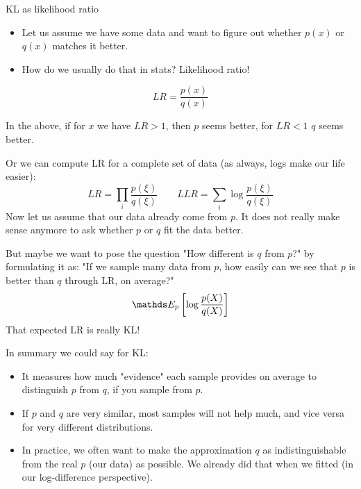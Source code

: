 \documentclass[11pt,compress,t,notes=noshow, xcolor=table]{beamer}
\begin{document}
\begin{vbframe}{KL as likelihood ratio}

\begin{itemize}
\item Let us assume we have some data and want to figure out whether $p(x)$ or $q(x)$ matches it better.
\item How do we usually do that in stats? Likelihood ratio! 
\end{itemize}

$$ LR = \frac{p(x)}{q(x)} $$
  
In the above, if for $x$ we have $LR>1$, then $p$ seems better, for $LR < 1$ $q$ seems better.

\framebreak

Or we can compute LR for a complete set of data (as always, logs make our life easier):
$$ LR = \prod_i \frac{p(\xi)}{q(\xi)} \qquad LLR = \sum_i \log \frac{p(\xi)}{q(\xi)} $$
Now let us assume that our data already come from $p$. It does not really make sense anymore to ask 
whether $p$ or $q$ fit the data better.

But maybe we want to pose the question "How different is $q$ from $p$?" by formulating it as:
"If we sample many data from $p$, how easily can we see that $p$ is better than $q$ through LR, on average?"
$$ \E_p \left[\log \frac{p(X)}{q(X)}\right] $$
That expected LR is really KL!

\framebreak 

In summary we could say for KL:
\begin{itemize}
\item It measures how much "evidence" each sample provides on average to distinguish $p$ from $q$, 
  if you sample from $p$.
\item If $p$ and $q$ are very similar, most samples will not help much, and vice versa for very different distributions.
\item In practice, we often want to make the approximation $q$ as indistinguishable from the real $p$ (our data) as possible. We already did that when we fitted (in our log-difference perspective).
\end{itemize}

\end{vbframe}


  
\end{document}

